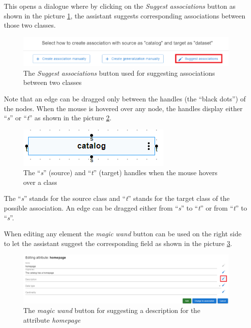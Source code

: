 This opens a dialogue where by clicking on the \textit{Suggest associations} button as shown in the picture \ref{fig:suggest_associations_2}, the assistant suggests corresponding associations between those two classes.

\begin{figure}[!h]
    \includegraphics[scale=0.4]{../docs/images/frontend/suggest-associations-2.png}
    \caption{\centering The \textit{Suggest associations} button used for suggesting associations between two classes}
    \label{fig:suggest_associations_2}
\end{figure}

Note that an edge can be dragged only between the handles (the ``black dots'') of the nodes. When the mouse is hovered over any node, the handles display either ``\textit{s}'' or ``\textit{t}'' as shown in the picture \ref{fig:handles}.

\begin{figure}[!h]
    \includegraphics[scale=0.5]{../docs/images/frontend/handles.png}
    \caption{\centering The ``\textit{s}'' (source) and ``\textit{t}'' (target) handles when the mouse hovers over a class}
    \label{fig:handles}
\end{figure}

The ``\textit{s}'' stands for the source class and ``\textit{t}'' stands for the target class of the possible association. An edge can be dragged either from ``\textit{s}'' to ``\textit{t}'' or from ``\textit{t}'' to ``\textit{s}''.

When editing any element the \textit{magic wand} button can be used on the right side to let the assistant suggest the corresponding field as shown in the picture \ref{fig:suggest_single_field}.

\begin{figure}[!h]
    \includegraphics[scale=0.35]{../docs/images/frontend/suggest-single-field.png}
    \caption{\centering The \textit{magic wand} button for suggesting a description for the attribute \textit{homepage}}
    \label{fig:suggest_single_field}
\end{figure}

